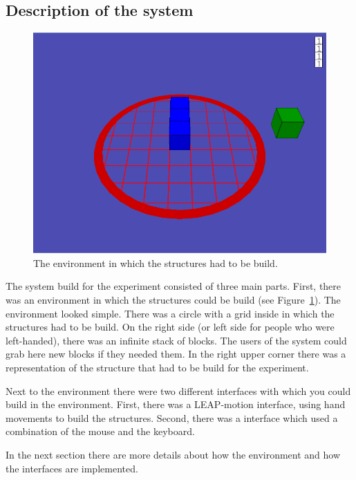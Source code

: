 \subsection{Description of the system}
\begin{figure}[H]
\includegraphics[width=\textwidth]{imgs/environment}
\caption{The environment in which the structures had to be build.}
\label{fig:environment}
\end{figure}

The system build for the experiment consisted of three main parts. First, there was an environment in which the structures could be build (see Figure~\ref{fig:environment}). The environment looked simple. There was a circle with a grid inside in which the structures had to be build. On the right side (or left side for people who were left-handed), there was an infinite stack of blocks. The users of the system could grab here new blocks if they needed them. In the right upper corner there was a representation of the structure that had to be build for the experiment.

Next to the environment there were two different interfaces with which you could build in the environment. First, there was a LEAP-motion interface, using hand movements to build the structures. Second, there was a interface which used a combination of the mouse and the keyboard.

In the next section there are more details about how the environment and how the interfaces are implemented.

